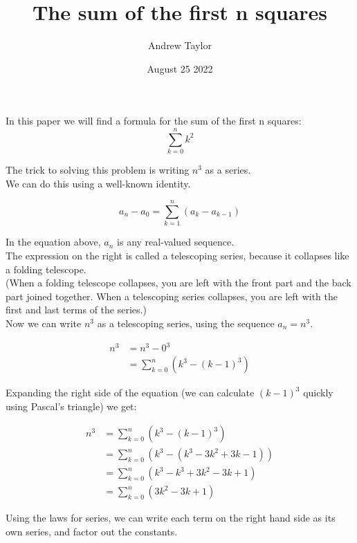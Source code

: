 \documentclass{article}
\title{The sum of the first n squares}
\author{Andrew Taylor}
\date{August 25 2022}
\begin{document}
\maketitle

In this paper we will find a formula for the sum of the first n squares: $$ \sum_{k=0}^{n} k^{2} $$

The trick to solving this problem is writing $n^3$ as a series. \\

We can do this using a well-known identity.

\begin{equation*}
a_{n} - a_{0} = \sum_{k=1}^{n} \left( a_{k} - a_{k-1} \right)
\end{equation*}

In the equation above, $a_{n}$ is any real-valued sequence. \\

The expression on the right is called a telescoping series, because it collapses like a folding telescope. \\

(When a folding telescope collapses, you are left with the front part and the back part joined together. When a telescoping series collapses, you are left with the first and last terms of the series.) \\

Now we can write $n^3$ as a telescoping series, using the sequence $a_{n} = n^{3}$.

\begin{align*}
n^3 &= n^3 - 0^3 \\
&= \sum_{k=0}^{n} \left( k^3 - (k-1)^3 \right)
\end{align*}

Expanding the right side of the equation (we can calculate $(k-1)^3$ quickly using Pascal's triangle) we get:

\begin{align*}
n^3 &= \sum_{k=0}^{n} \left( k^3 - (k-1)^3 \right) \\
&= \sum_{k=0}^{n} \left( k^3 - (k^3 - 3k^2 + 3k - 1) \right) \\
&= \sum_{k=0}^{n} \left( k^3 - k^3 + 3k^2 - 3k + 1 \right) \\
&= \sum_{k=0}^{n} \left( 3k^2 - 3k + 1 \right) 
\end{align*}

Using the laws for series, we can write each term on the right hand side as its own series, and factor out the constants. \\
\end{document}
